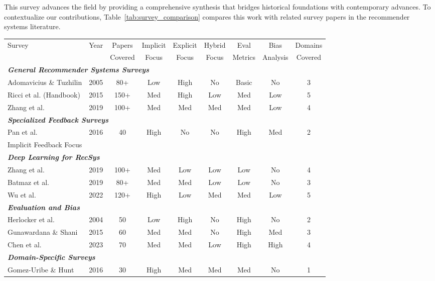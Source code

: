 This survey advances the field by providing a comprehensive synthesis that bridges historical foundations with contemporary advances. To contextualize our contributions, Table~\ref{tab:survey_comparison} compares this work with related survey papers in the recommender systems literature.

\begin{table*}[ht]
\centering
\tiny
\caption{Comparison with Related Survey Papers}
\label{tab:survey_comparison}
\begin{tabular}{@{}lcccccccc@{}}
\toprule
Survey & Year & Papers & Implicit & Explicit & Hybrid & Eval & Bias & Domains \\
 & & Covered & Focus & Focus & Focus & Metrics & Analysis & Covered \\
\midrule
\multicolumn{9}{l}{\textit{\textbf{General Recommender Systems Surveys}}} \\
\midrule
Adomavicius \& Tuzhilin & 2005 & 80+ & Low & High & No & Basic & No & 3 \\
Ricci et al. (Handbook) & 2015 & 150+ & Med & High & Low & Med & Low & 5 \\
Zhang et al. & 2019 & 100+ & Med & Med & Med & Med & Low & 4 \\
\midrule
\multicolumn{9}{l}{\textit{\textbf{Specialized Feedback Surveys}}} \\
\midrule
Pan et al. & 2016 & 40 & High & No & No & High & Med & 2 \\
Implicit Feedback Focus & & & & & & & & \\
\midrule
\multicolumn{9}{l}{\textit{\textbf{Deep Learning for RecSys}}} \\
\midrule
Zhang et al. & 2019 & 100+ & Med & Low & Low & Low & No & 4 \\
Batmaz et al. & 2019 & 80+ & Med & Med & Low & Low & No & 3 \\
Wu et al. & 2022 & 120+ & High & Low & Med & Med & Low & 5 \\
\midrule
\multicolumn{9}{l}{\textit{\textbf{Evaluation and Bias}}} \\
\midrule
Herlocker et al. & 2004 & 50 & Low & High & No & High & No & 2 \\
Gunawardana \& Shani & 2015 & 60 & Med & Med & No & High & Med & 3 \\
Chen et al. & 2023 & 70 & Med & Med & Low & High & High & 4 \\
\midrule
\multicolumn{9}{l}{\textit{\textbf{Domain-Specific Surveys}}} \\
\midrule
Gomez-Uribe \& Hunt & 2016 & 30 & High & Med & Med & Med & No & 1 \\

\end{tabular}
\end{table*}

